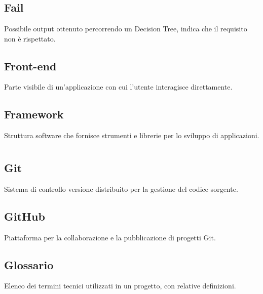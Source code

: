 \documentclass[a4paper,12pt]{article}
\begin{document}
\newpage    
        \section{}
        
          \subsection*{Fail}
			Possibile output ottenuto percorrendo un Decision Tree, indica che il requisito non è rispettato.
          \subsection*{Front-end}
			Parte visibile di un'applicazione con cui l'utente interagisce direttamente.
          \subsection*{Framework}
			Struttura software che fornisce strumenti e librerie per lo sviluppo di applicazioni.
        
\newpage 
      
        \section{}
        
          \subsection*{Git}
			Sistema di controllo versione distribuito per la gestione del codice sorgente.
          \subsection*{GitHub}
			Piattaforma per la collaborazione e la pubblicazione di progetti Git.
          \subsection*{Glossario}
			Elenco dei termini tecnici utilizzati in un progetto, con relative definizioni.
        
\newpage
        \section{}
        
\newpage
        \section{}
        
\end{document}
